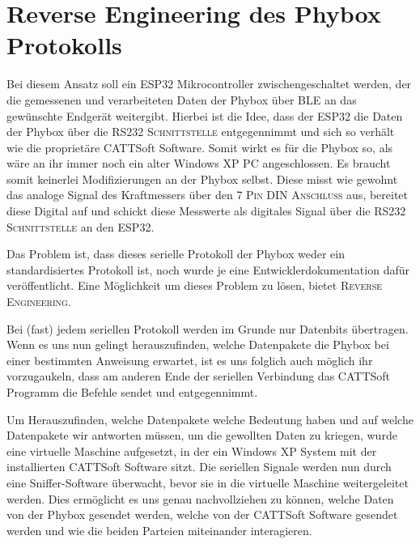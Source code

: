 \section{Reverse Engineering des Phybox Protokolls}
\label{sec:Reverse Engineering des Phybox Protokolls}

\begin{figure}[htb]
    \centering
\end{figure}

Bei diesem Ansatz soll ein \ac{ESP32} Mikrocontroller zwischengeschaltet werden, der die gemessenen und verarbeiteten Daten der Phybox über \ac{BLE} an das gewünschte Endgerät weitergibt. Hierbei ist die Idee, dass der ESP32 die Daten der Phybox über die \textsc{RS232 Schnittstelle} entgegennimmt und sich so verhält wie die proprietäre CATTSoft Software. Somit wirkt es für die Phybox so, als wäre an ihr immer noch ein alter Windows XP \ac{PC} angeschlossen. Es braucht somit keinerlei Modifizierungen an der Phybox selbst. Diese misst wie gewohnt das analoge Signal des Kraftmessers über den \textsc{7 Pin DIN Anschluss} aus, bereitet diese Digital auf und schickt diese Messwerte als digitales Signal über die \textsc{RS232 Schnittstelle} an den \ac{ESP32}.

Das Problem ist, dass dieses serielle Protokoll der Phybox weder ein standardisiertes Protokoll ist, noch wurde je eine Entwicklerdokumentation dafür veröffentlicht. Eine Möglichkeit um dieses Problem zu lösen, bietet \textsc{Reverse Engineering}.

Bei (fast) jedem seriellen Protokoll werden im Grunde nur Datenbits übertragen. Wenn es uns nun gelingt herauszufinden, welche Datenpakete die Phybox bei einer bestimmten Anweisung erwartet, ist es uns folglich auch möglich ihr vorzugaukeln, dass am anderen Ende der seriellen Verbindung das CATTSoft Programm die Befehle sendet und entgegennimmt.

Um Herauszufinden, welche Datenpakete welche Bedeutung haben und auf welche Datenpakete wir antworten müssen, um die gewollten Daten zu kriegen, wurde eine virtuelle Maschine aufgesetzt, in der ein Windows XP System mit der installierten CATTSoft Software sitzt. Die seriellen Signale werden nun durch eine Sniffer-Software überwacht, bevor sie in die virtuelle Maschine weitergeleitet werden. Dies ermöglicht es uns genau nachvollziehen zu können, welche Daten von der Phybox gesendet werden, welche von der CATTSoft Software gesendet werden und wie die beiden Parteien miteinander interagieren.

